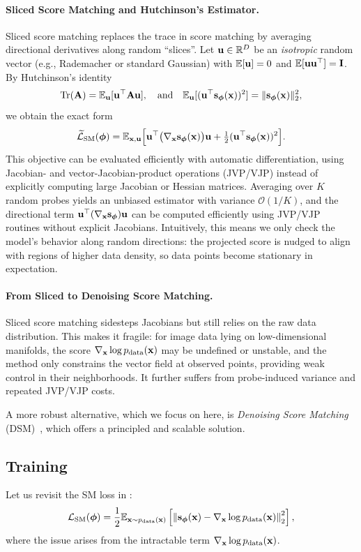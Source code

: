 \paragraph{Sliced Score Matching and Hutchinson's Estimator.} Sliced score matching  replaces the trace in score matching by averaging directional derivatives along random ``slices''. Let ${\mathbf{u}}\in\mathbb{R}^D$ be an \emph{isotropic} random vector (e.g., Rademacher or standard Gaussian) with
$\mathbb{E}[{\mathbf{u}}]=0$ and $\mathbb{E}[{\mathbf{u}}{\mathbf{u}}^\top]=\mathbf I$. By Hutchinson’s identity 
\[
\operatorname{Tr}({\mathbf{A}})=\mathbb{E}_{{\mathbf{u}}}[{\mathbf{u}}^\top {\mathbf{A}} {\mathbf{u}}],\quad\text{and}\quad\mathbb{E}_{{\mathbf{u}}}[({\mathbf{u}}^\top{\mathbf{s}}_{{\bm{\phi}}}({\mathbf{x}}))^2]=\|{\mathbf{s}}_{{\bm{\phi}}}({\mathbf{x}})\|_2^2,
\]
 we obtain the exact form
\[
\widetilde{\mathcal{L}}_{\mathrm{SM}}({\bm{\phi}})
=\mathbb{E}_{{\mathbf{x}},{\mathbf{u}}} \Big[{\mathbf{u}}^\top\big(\nabla_{{\mathbf{x}}}{\mathbf{s}}_{{\bm{\phi}}}({\mathbf{x}})\big){\mathbf{u}}+\tfrac12({\mathbf{u}}^\top{\mathbf{s}}_{{\bm{\phi}}}({\mathbf{x}}))^2\Big].
\]
This objective can be evaluated efficiently with automatic differentiation, using Jacobian- and vector-Jacobian-product operations (JVP/VJP) instead of explicitly computing large Jacobian or Hessian matrices.
Averaging over $K$ random probes yields an unbiased estimator with variance $\mathcal{O}(1/K)$, 
and the directional term ${\mathbf{u}}^\top(\nabla_{{\mathbf{x}}}{\mathbf{s}}_{{\bm{\phi}}}){\mathbf{u}}$ can be computed 
efficiently using JVP/VJP routines without explicit Jacobians.  Intuitively, this means we only check the model’s behavior along random directions: 
the projected score is nudged to align with regions of higher data density, 
so data points become stationary in expectation. 

\paragraph{From Sliced to Denoising Score Matching.} Sliced score matching sidesteps Jacobians but still relies on the raw data distribution. 
This makes it fragile: for image data lying on low-dimensional manifolds, 
the score $\nabla_{{\mathbf{x}}}\log p_{\mathrm{data}}({\mathbf{x}})$ may be undefined or unstable, 
and the method only constrains the vector field at observed points, 
providing weak control in their neighborhoods. 
It further suffers from probe-induced variance and repeated JVP/VJP costs. 

A more robust alternative, which we focus on here, is \emph{Denoising Score Matching} (DSM)~\citep{vincent2011connection}, 
which offers a principled and scalable solution.



\subsection{Training}
Let us revisit the SM loss in :
\begin{align*}
     \mathcal{L}_{\text{SM}}(\bm{\phi}) =  \frac{1}{2} \mathbb{E}_{{\mathbf{x}} \sim p_{\text{data}}({\mathbf{x}})} \left[ \left\lVert{\mathbf{s}}_{\bm{\phi}}({\mathbf{x}}) - \nabla_{{\mathbf{x}}} \log p_{\text{data}}({\mathbf{x}})\right\rVert_2^2 \right],
\end{align*}
where the issue arises from the intractable term $\nabla_{{\mathbf{x}}} \log p_{\text{data}}({\mathbf{x}})$.

